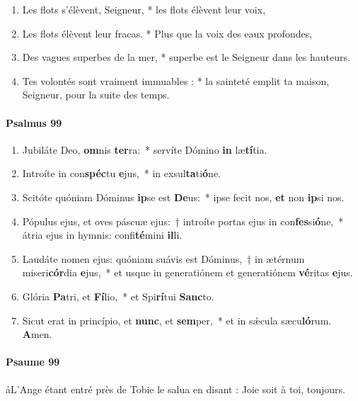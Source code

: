 \documentclass[twoside]{article}
\begin{document}
\begin{paracol}[1]{2}
\begin{enumerate}[wide, itemsep=0mm, labelwidth=!, labelindent=0pt, label=\color{gregoriocolor}\theenumi]
\item Les flots s'élèvent, Seigneur, *
les flots élèvent leur voix,

\item Les flots élèvent leur fracas. *
Plus que la voix des eaux profondes,

\item Des vagues superbes de la mer, *
superbe est le Seigneur dans les hauteurs.

\item Tes volontés sont vraiment immuables : *
la sainteté emplit ta maison, Seigneur, pour la suite des temps.

\end{enumerate}

\switchcolumn*
\paragraph{Psalmus 99}


\begin{enumerate}[wide, itemsep=0mm, labelwidth=!, labelindent=0pt, label=\color{gregoriocolor}\theenumi]
\item Jubiláte Deo, \textbf{om}nis \textbf{ter}ra:~* servíte Dómino \textbf{in} læ\textbf{tí}tia.
\item Introíte in con\textbf{spéc}tu \textbf{e}jus,~* in exsul\textbf{ta}ti\textbf{ó}ne.
\item Scitóte quóniam Dóminus \textbf{ip}se est \textbf{De}us:~* ipse fecit nos, \textbf{et} non \textbf{ip}si nos.
\item Pópulus ejus, et oves páscuæ ejus:~† introíte portas ejus in con\textbf{fes}si\textbf{ó}ne,~* átria ejus in hymnis: confi\textbf{té}mini \textbf{il}li.
\item Laudáte nomen ejus: quóniam suávis est Dóminus,~† in ætérnum miseri\textbf{cór}dia \textbf{e}jus,~* et usque in generatiónem et generatiónem \textbf{vé}ritas \textbf{e}jus.
\item Glória \textbf{Pa}tri, et \textbf{Fí}lio,~* et Spi\textbf{rí}tui \textbf{Sanc}to.
\item Sicut erat in princípio, et \textbf{nunc}, et \textbf{sem}per,~* et in sǽcula sæcu\textbf{ló}rum. \textbf{A}men.
\end{enumerate}

\switchcolumn

\paragraph{Psaume 99}
\aa L’Ange étant entré près de Tobie le salua en disant : Joie soit à toi, toujours.


\end{paracol}
\end{document}
